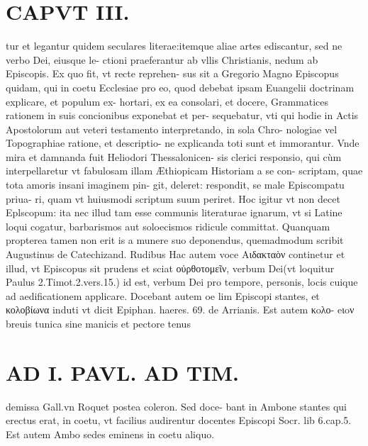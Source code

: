 \documentclass{article}
\begin{document}
\begin{pages}
\section*{CAPVT  III. }
\marginpar{[ p.129 ]}\pstart tur et legantur quidem seculares literae:itemque  aliae artes ediscantur, sed ne verbo Dei, eiusque le- ctioni praeferantur ab vllis Christianis, nedum ab Episcopis. Ex quo fit, vt recte reprehen- sus sit a Gregorio Magno Episcopus quidam, qui in coetu Ecclesiae pro eo, quod debebat ipsam Euangelii doctrinam explicare, et populum ex- hortari, ex ea consolari, et docere, Grammatices rationem in suis concionibus exponebat et per- sequebatur, vti qui hodie in Actis Apostolorum aut veteri testamento interpretando, in sola Chro- nologiae vel Topographiae ratione, et descriptio- ne explicanda toti sunt et immorantur. Vnde mira et damnanda fuit Heliodori Thessalonicen- sis clerici responsio, qui cùm interpellaretur vt fabulosam illam Æthiopicam Historiam a se con- scriptam, quae tota amoris insani imaginem pin- git, deleret: respondit, se male Episcompatu priua- ri, quam vt huiusmodi scriptum suum periret. Hoc igitur vt non decet Eplscopum: ita nec illud tam esse communis literaturae ignarum, vt si Latine loqui cogatur, barbarismos aut soloecismos ridicule committat. Quanquam propterea tamen non erit is a munere suo deponendus, quemadmodum scribit Augustinus de Catechizand. Rudibus   \pend\pstart Hac autem voce Αιδακταὸν continetur et illud, vt Episcopus sit prudens et sciat οὐρθοτομεῖν, verbum Dei(vt loquitur Paulus 2.Timot.2.vers.15.) id est, verbum Dei pro tempore, personis, locis cuique ad aedificationem applicare. Docebant autem oe lim Episcopi stantes, et κολοβίωνα induti vt dicit Epiphan. haeres. 69. de Arrianis. Est autem κoλο- eιoν breuis tunica sine manicis et pectore tenus  \pend
\section*{AD I. PAVL. AD TIM. }
\marginpar{[ p.130 ]}\pstart demissa Gall.vn Roquet postea coleron. Sed doce- bant in Ambone stantes qui erectus erat, in coetu, vt facilius audirentur docentes Episcopi Socr. lib 6.cap.5. Est autem Ambo sedes eminens in coetu aliquo.  \pend
{}
{}

\end{pages}
\end{document}
